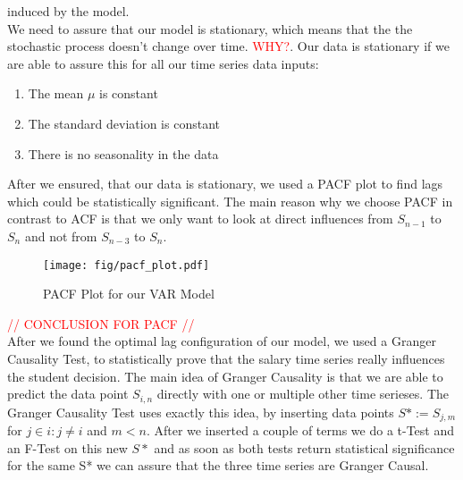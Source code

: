 \documentclass{article}
\theoremstyle{plain}
\theoremstyle{definition}
\theoremstyle{remark}
\begin{document}
induced by the model.\\
We need to assure that our model is stationary, which means that the the stochastic process doesn't change over time. \textcolor{red}{WHY?}.
Our data is stationary if we are able to assure this for all our time series data inputs:
\begin{enumerate}[label=\Roman*]
    \item The mean $\mu$ is constant
    \item The standard deviation is constant
    \item There is no seasonality in the data
\end{enumerate}

After we ensured, that our data is stationary, we used a PACF plot to find lags which could be statistically significant. 
The main reason why we choose PACF in contrast to ACF is that we only want to look at direct influences from $S_{n-1}$ to $S_{n}$ and not from $S_{n-3}$ to $S_n$.
\begin{figure}[H]
    \centering
    \texttt{[image: fig/pacf\_plot.pdf]}
    \caption{PACF Plot for our VAR Model}
    \label{fig:enter-label}
\end{figure}
\textcolor{red}{// CONCLUSION FOR PACF // }\\

After we found the optimal lag configuration of our model, we used a Granger Causality Test, to statistically prove that the salary time series really influences the student decision.
The main idea of Granger Causality is that we are able to predict the data point $S_{i,n}$ directly with one or multiple other time serieses. The Granger Causality Test uses exactly this
idea, by inserting data points $S*:=S_{j,m}$ for $j\in i:j\neq i$  and $m<n$. After we inserted a couple of terms we do a t-Test and an F-Test on this new $S*$ and as soon as both tests
return statistical significance for the same S* we can assure that the three time series are Granger Causal.






% 
\end{document}
